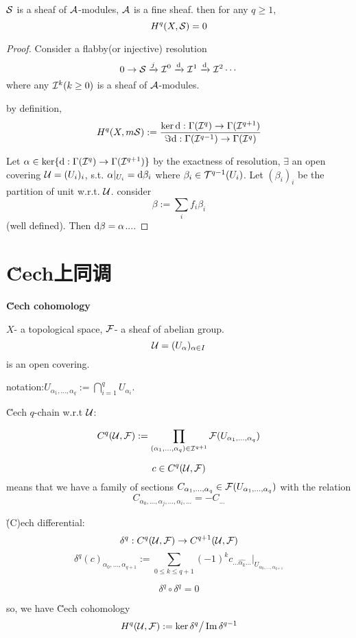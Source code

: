 \begin{thm}
$\mathcal{S}$ is a sheaf of $\mathcal{A}$-modules,
$\mathcal{A}$ is a fine sheaf. then for any $q\geq 1$,
$$H^q(X,\mathcal{S})=0$$
\end{thm}
\begin{proof}
Consider a flabby(or injective) resolution
$$0\to\mathcal{S}\xrightarrow{j}\mathcal{I}^0\xrightarrow{\mathrm{d}}\mathcal{I}^1\xrightarrow{\mathrm{d}}\mathcal{I}^2\cdots$$
where any $\mathcal{I}^k(k\geq 0)$ is a sheaf of $\mathcal{A}$-modules.

by definition,
$$H^q(X,m\mathcal{S}):=\frac{\ker\mathrm{d}:\Gamma(\mathcal{I}^q)\to\Gamma(\mathcal{I}^{q+1})}
                       {\Im\mathrm{d}:\Gamma(\mathcal{I}^{q-1})\to\Gamma(\mathcal{I}^{q})}$$

Let $\alpha\in\ker\{\mathrm{d}:\Gamma(\mathcal{I}^q)\to\Gamma(\mathcal{I}^{q+1})\}$
by the exactness of resolution, $\exists$ an open covering $\mathcal{U}=(U_{i})_{i}$,
s.t. $\alpha|_{U_{i}}=\mathrm{d}\beta_{i}$
where $\beta_{i}\in\mathcal{T}^{q-1}(U_{i})$.
Let $(\beta_{i})_{i}$ be the partition of unit w.r.t. $\mathcal{U}$.
consider
$$\beta:=\sum_{i}f_i\beta_i$$
(well defined). Then $\mathrm{d}\beta=\alpha$....
\end{proof}

\section{\u{C}ech上同调}
\textbf{\u{C}ech cohomology}

$X$- a topological space, $\mathcal{F}$- a sheaf of abelian group.
$$\mathcal{U}=(U_{\alpha})_{\alpha\in I}$$
is an open covering.

notation:$U_{\alpha_1,...,\alpha_q}:=\bigcap_{i=1}^qU_{\alpha_i}$.

\u{C}ech $q$-chain w.r.t $\mathcal{U}$:

$$C^q(\mathcal{U},\mathcal{F}):=\prod_{(\alpha_1,...,\alpha_q)
\in\mathcal{I}^{q+1}}\mathcal{F}(U_{\alpha_1,...,\alpha_q})$$

$$c\in C^q(\mathcal{U},\mathcal{F})$$
means that we have a family of sections
$C_{\alpha_1,...,\alpha_q}\in\mathcal{F}(U_{\alpha_1,...,\alpha_q})$
with the relation
$$C_{\alpha_0,...,\alpha_j,...,\alpha_i,...}=-C_{...}$$

\u(C)ech differential:
$$\delta^q:C^q(\mathcal{U},\mathcal{F})\to C^{q+1}(\mathcal{U},\mathcal{F})$$
$$\delta^q(c)_{\alpha_0,...,\alpha_{q+1}}
:=\sum_{0\leq k\leq q+1}(-1)^k
c_{...\hat{\alpha_k}...}|_{U_{\alpha_0,...,\alpha_{q+1}}}$$

\begin{prop}
$$\delta^q\circ\delta^q=0$$
\end{prop}

so, we have \u{C}ech cohomology
$$H^q(\mathcal{U},\mathcal{F}):=\ker\delta^q\big/\operatorname{Im}\delta^{q-1}$$

